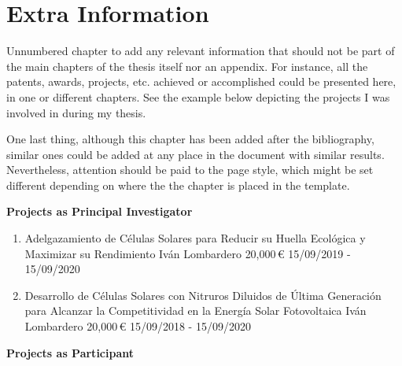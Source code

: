 \chapter*{Extra Information}\label{ch:ExtraInfo} 

Unnumbered chapter to add any relevant information that should not be part of the main chapters of the thesis itself nor an appendix. For instance, all the patents, awards, projects, etc. achieved or accomplished could be presented here, in one or different chapters. See the example below depicting the projects I was involved in during my thesis.

One last thing, although this chapter has been added after the bibliography, similar ones could be added at any place in the document with similar results. Nevertheless, attention should be paid to the page style, which might be set different depending on where the the chapter is placed in the \ThesiX{} template.\\

\begin{Large}
	\noindent\textbf{Projects as Principal Investigator}
\end{Large}

\begin{enumerate}[leftmargin=2.5mm, labelsep=-5mm]
	\setcounter{enumi}{0}
	\item \begin{project}
	{Adelgazamiento de Células Solares para Reducir su Huella Ecológica y Maximizar su Rendimiento}
	{Iván Lombardero}
	{20,000\,\euro}
	{15/09/2019 - 15/09/2020}
	\end{project}
	
	\item \begin{project}
	{Desarrollo de Células Solares con Nitruros Diluidos de Última Generación para Alcanzar la Competitividad en la Energía Solar Fotovoltaica}
	{Iván Lombardero}
	{20,000\,\euro}
	{15/09/2018 - 15/09/2020}
	\end{project}
\end{enumerate}

\begin{Large}
	\noindent\textbf{Projects as Participant}
\end{Large}

